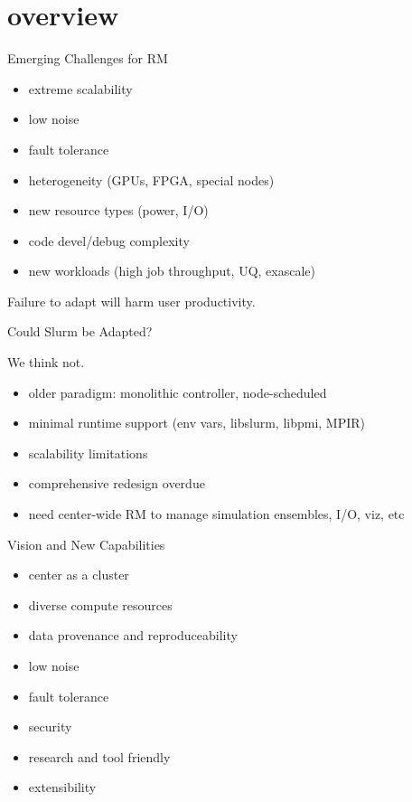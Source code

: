 \documentclass[default,pdf,colorBG,slideColor]{prosper}
\begin{document}
\part{overview}
\begin{slide}{Emerging Challenges for RM}{\small
\begin{itemize}
  \item{extreme scalability}
  \item{low noise}
  \item{fault tolerance}
  \item{heterogeneity (GPUs, FPGA, special nodes)}
  \item{new resource types (power, I/O)}
  \item{code devel/debug complexity}
  \item{new workloads (high job throughput, UQ, exascale)}
\end{itemize}
Failure to adapt will harm user productivity.
}\end{slide}
\begin{slide}{Could Slurm be Adapted?}{\small
We think not.
\begin{itemize}
  \item{older paradigm: monolithic controller, node-scheduled}
  \item{minimal runtime support (env vars, libslurm, libpmi, MPIR)}
  \item{scalability limitations}
  \item{comprehensive redesign overdue}
  \item{need center-wide RM to manage simulation ensembles, I/O, viz, etc}
\end{itemize}
}\end{slide}
\begin{slide}{Vision and New Capabilities}{\small
\begin{itemize}
  \item{center as a cluster}
  \item{diverse compute resources}
  \item{data provenance and reproduceability}
  \item{low noise}
  \item{fault tolerance}
  \item{security}
  \item{research and tool friendly}
  \item{extensibility}
\end{itemize}
}\end{slide}
\end{document}
